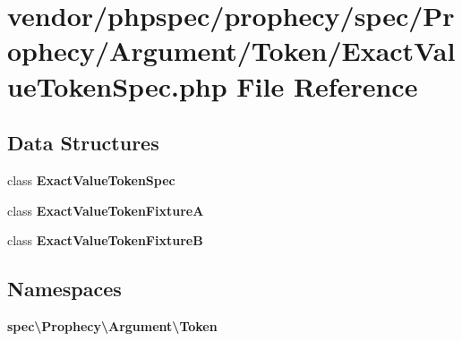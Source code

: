 \section{vendor/phpspec/prophecy/spec/\+Prophecy/\+Argument/\+Token/\+Exact\+Value\+Token\+Spec.php File Reference}
\label{_exact_value_token_spec_8php}
\subsection*{Data Structures}
\begin{DoxyCompactItemize}
\item 
class {\bf Exact\+Value\+Token\+Spec}
\item 
class {\bf Exact\+Value\+Token\+Fixture\+A}
\item 
class {\bf Exact\+Value\+Token\+Fixture\+B}
\end{DoxyCompactItemize}
\subsection*{Namespaces}
\begin{DoxyCompactItemize}
\item 
 {\bf spec\textbackslash{}\+Prophecy\textbackslash{}\+Argument\textbackslash{}\+Token}
\end{DoxyCompactItemize}

